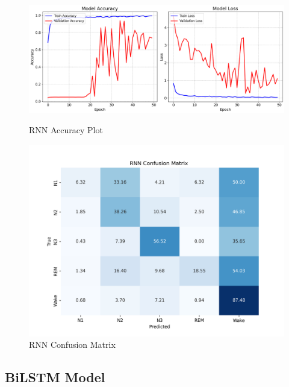 \begin{figure}[H]
	\centering
	\begin{minipage}{0.66\textwidth}
		\centering
		\includegraphics[width=\linewidth]{img/paper_2/Rnn Accuracy Plot.png}
		\caption{RNN Accuracy Plot}
		\label{fig:rnn_accuracy}
	\end{minipage}
	\hfill
	\begin{minipage}{0.32\textwidth}
		\centering
		\includegraphics[width=\linewidth]{img/paper_2/RNN_cm.png}
		\caption{RNN Confusion Matrix}
		\label{fig:rnn_cm}
	\end{minipage}
\end{figure}


\subsection{BiLSTM Model}


